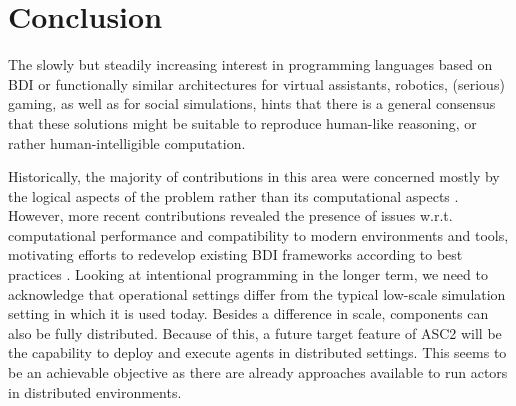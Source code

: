 \section{Conclusion}

The slowly but steadily increasing interest in programming languages based on BDI or functionally similar architectures for virtual assistants, robotics, (serious) gaming, as well as for social simulations, hints that there is a general consensus that these solutions might be suitable to reproduce human-like reasoning, or rather human-intelligible computation. 

Historically, the majority of contributions in this area were concerned mostly by the logical aspects of the problem rather than its computational aspects \cite{Herzig2017}. However, more recent contributions %
revealed the presence of issues w.r.t. computational performance and compatibility to modern environments and tools, motivating efforts to redevelop existing BDI frameworks according to best practices \cite{LJ,pyson}. Looking at intentional programming in the longer term, we need to acknowledge that operational settings differ from the typical low-scale simulation setting in which it is used today. Besides a difference in scale, components can also be fully distributed. %
Because of this, a future target feature of ASC2 will be the capability to deploy and execute agents in distributed settings. This seems to be an achievable objective as there are already approaches available to run actors in distributed environments.%

